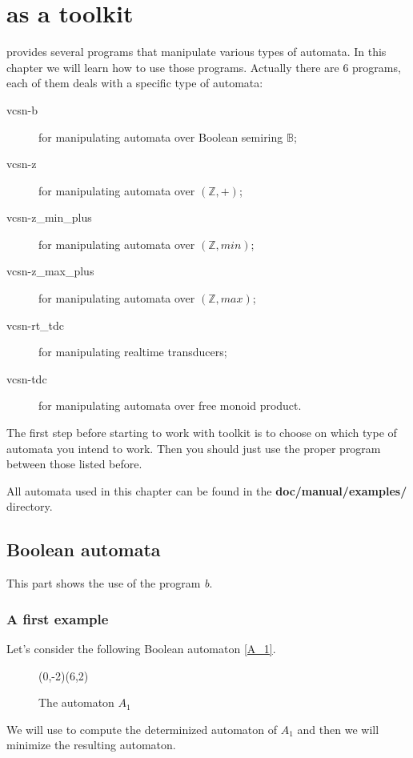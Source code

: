 \chapter{\Vauc as a toolkit}

\Vauc provides several programs that manipulate various types of
automata. In this chapter we will learn how to use those
programs. Actually there are 6 programs, each of them deals with a
specific type of automata:
\begin{description}
  \item [vcsn-b] for manipulating automata over Boolean semiring $\mathbb{B}$;
  \item [vcsn-z] for manipulating automata over $(\mathbb{Z},+)$;
  \item [vcsn-z\_min\_plus] for manipulating automata over $(\mathbb{Z},min)$;
  \item [vcsn-z\_max\_plus] for manipulating automata over $(\mathbb{Z},max)$;
  \item [vcsn-rt\_tdc] for manipulating realtime transducers;
  \item [vcsn-tdc] for manipulating automata over free monoid product.
\end{description}
The first step before starting to work with \Vauc toolkit is to choose
on which type of automata you intend to work. Then you should just use
the proper program between those listed before.

All automata used in this chapter can be found in the
\textbf{doc/manual/examples/} directory.
\newpage

\section{Boolean automata}

This part shows the use of the program \textit{b}.

\subsection{A first example}

Let's consider the following Boolean automaton \autoref{A_1}.
\begin{figure}[ht] \centering
  \begin{VCPicture}{(0,-2)(6,2)}
      
     
     
       
  \end{VCPicture}
  \caption{The automaton $A_1$}
  \label{A_1}
\end{figure}
We will use \Vauc to compute the determinized automaton of $A_1$ and
then we will minimize the resulting automaton.

